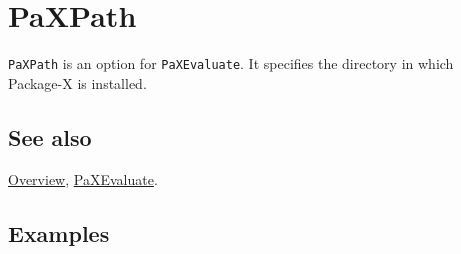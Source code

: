 \documentclass[../FeynHelpersManual.tex]{subfiles}
\begin{document}
\hypertarget{paxpath}{
\section{PaXPath}\label{paxpath}}

\texttt{PaXPath} is an option for \texttt{PaXEvaluate}. It specifies the
directory in which Package-X is installed.

\subsection{See also}

\hyperlink{toc}{Overview}, \hyperlink{paxevaluate}{PaXEvaluate}.

\subsection{Examples}
\end{document}
